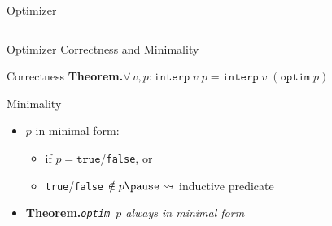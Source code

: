 \documentclass[aspectratio=169,xcolor=dvipsnames]{beamer}
\begin{document}
\begin{frame}{Optimizer}
\begin{columns}
\begin{minipage}[t][\textheight][t]{\textwidth}
            \end{minipage}
        \end{columns}
    \end{frame}

    \begin{frame}{Optimizer Correctness and Minimality}
        \begin{block}{Correctness}
            \textbf{Theorem.}\hspace*{8pt}\emph{$\forall\,v, p : \texttt{interp}\;v\;p = \texttt{interp}\;v\;(\texttt{optim}\;p)$}
        \end{block}

        \pause

        \begin{block}{Minimality}
            \begin{itemize}
                \item $p$ in \alert{minimal form}:
                    \begin{itemize}
                        \item if $p = \texttt{true}$/\texttt{false}, or
                        \item \texttt{true}/\texttt{false} $\notin p \pause \leadsto$ inductive predicate
                    \end{itemize}
                \pause
                \item \textbf{Theorem.}\hspace*{8pt}\emph{\texttt{optim $p$} always in minimal form}
            \end{itemize}
        \end{block}
    \end{frame}
\end{document}
